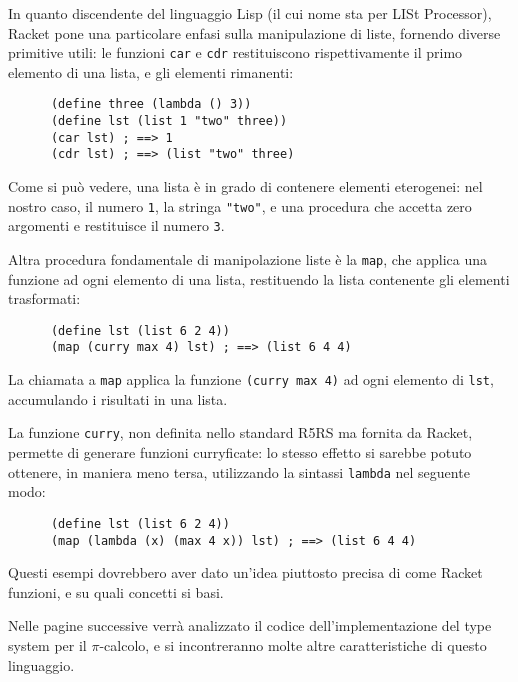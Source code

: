 In quanto discendente del linguaggio Lisp (il cui nome sta per LISt
Processor), Racket pone una particolare enfasi sulla manipulazione di
liste, fornendo diverse primitive utili: le funzioni \lstinline{car} e
\lstinline{cdr} restituiscono rispettivamente il primo elemento di una
lista, e gli elementi rimanenti:

\begin{lstlisting}
      (define three (lambda () 3))
      (define lst (list 1 "two" three))
      (car lst) ; ==> 1
      (cdr lst) ; ==> (list "two" three)
\end{lstlisting}

Come si pu\`o vedere, una lista \`e in grado di contenere elementi
eterogenei: nel nostro caso, il numero \lstinline{1}, la stringa
\lstinline{"two"}, e una procedura che accetta zero argomenti e restituisce
il numero \lstinline{3}.

Altra procedura fondamentale di manipolazione liste \`e la \lstinline{map},
che applica una funzione ad ogni elemento di una lista, restituendo la
lista contenente gli elementi trasformati:

\begin{lstlisting}
      (define lst (list 6 2 4))
      (map (curry max 4) lst) ; ==> (list 6 4 4)
\end{lstlisting}

La chiamata a \lstinline{map} applica la funzione \lstinline{(curry max 4)}
ad ogni elemento di \lstinline{lst}, accumulando i risultati in una lista.

La funzione \lstinline{curry}, non definita nello standard R5RS ma fornita
da Racket, permette di generare funzioni curryficate: lo stesso effetto si
sarebbe potuto ottenere, in maniera meno tersa, utilizzando la sintassi
\lstinline{lambda} nel seguente modo:

\begin{lstlisting}
      (define lst (list 6 2 4))
      (map (lambda (x) (max 4 x)) lst) ; ==> (list 6 4 4)
\end{lstlisting}

Questi esempi dovrebbero aver dato un'idea piuttosto precisa di come Racket
funzioni, e su quali concetti si basi.

Nelle pagine successive verr\`a analizzato il codice dell'implementazione
del type system per il $\pi$-calcolo, e si incontreranno molte altre
caratteristiche di questo linguaggio.
